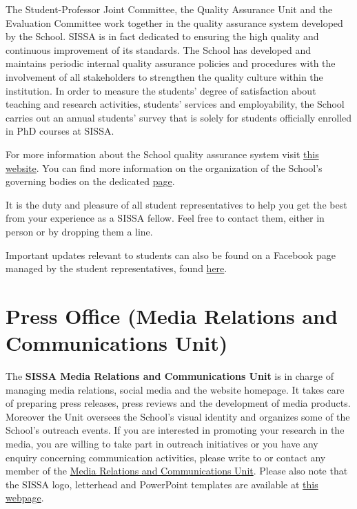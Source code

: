 \documentclass{sissavademecum}
\begin{document}
The Student-Professor Joint Committee, the Quality Assurance Unit and the Evaluation Committee work together in the quality assurance system developed by the School. SISSA is in fact dedicated to ensuring the high quality and continuous improvement of its standards. The School has developed and maintains periodic internal quality assurance policies and procedures with the involvement of all stakeholders to strengthen the quality culture within the institution. In order to measure the students' degree of satisfaction about teaching and research activities, students' services and employability, the School carries out an annual students' survey that is solely for students officially enrolled in PhD courses at SISSA. 

For more information about the School quality assurance system visit \href{https://www.sissa.it/qualita}{this website}. You can find more information on the organization of the School's governing bodies on the dedicated \href{https://www.sissa.it/general-organization}{page}.

It is the duty and pleasure of all student representatives to help you get the best from your experience as a SISSA fellow. Feel free to contact them, either in person or by dropping them a line.

Important updates relevant to students can also be found on a Facebook page managed by the student representatives, found \href{https://www.facebook.com/groups/sissastudents/}{here}.


\chapter{Press Office (Media Relations and Communications Unit)}

The \textbf{SISSA Media Relations and Communications Unit} is in charge of managing media relations, social media and the website homepage. It takes care of preparing press releases, press reviews and the development of media products. Moreover the Unit oversees the School's visual identity and organizes some of the School's outreach events. If you are interested in promoting your research in the media, you are willing to take part in outreach initiatives or you have any enquiry concerning communication activities, please write to  or contact any member of the \href{https://www.sissa.it/media-and-press}{Media Relations and Communications Unit}. Please also note that the SISSA logo, letterhead and PowerPoint templates are available at \href{https://www.sissa.it/researchers-and-sissa-staff}{this webpage}.
\end{document}
